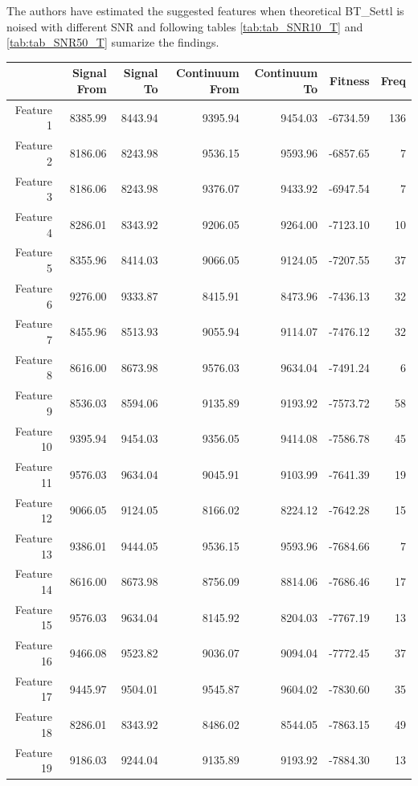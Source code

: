 {{The authors have estimated the suggested features when theoretical BT\_Settl 
is noised with different SNR and following tables \ref{tab:tab_SNR10_T} 
and \ref{tab:tab_SNR50_T} sumarize the findings.


\begin{table}
\begin{center}
\begin{tabular}{rrrrrrr}
  \hline
 & Signal From & Signal To & Continuum From & Continuum To & Fitness & Freq \\ 
  \hline
Feature 1 & 8385.99 & 8443.94 & 9395.94 & 9454.03 & -6734.59 & 136 \\ 
  Feature 2 & 8186.06 & 8243.98 & 9536.15 & 9593.96 & -6857.65 &   7 \\ 
  Feature 3 & 8186.06 & 8243.98 & 9376.07 & 9433.92 & -6947.54 &   7 \\ 
  Feature 4 & 8286.01 & 8343.92 & 9206.05 & 9264.00 & -7123.10 &  10 \\ 
  Feature 5 & 8355.96 & 8414.03 & 9066.05 & 9124.05 & -7207.55 &  37 \\ 
  Feature 6 & 9276.00 & 9333.87 & 8415.91 & 8473.96 & -7436.13 &  32 \\ 
  Feature 7 & 8455.96 & 8513.93 & 9055.94 & 9114.07 & -7476.12 &  32 \\ 
  Feature 8 & 8616.00 & 8673.98 & 9576.03 & 9634.04 & -7491.24 &   6 \\ 
  Feature 9 & 8536.03 & 8594.06 & 9135.89 & 9193.92 & -7573.72 &  58 \\ 
  Feature 10 & 9395.94 & 9454.03 & 9356.05 & 9414.08 & -7586.78 &  45 \\ 
  Feature 11 & 9576.03 & 9634.04 & 9045.91 & 9103.99 & -7641.39 &  19 \\ 
  Feature 12 & 9066.05 & 9124.05 & 8166.02 & 8224.12 & -7642.28 &  15 \\ 
  Feature 13 & 9386.01 & 9444.05 & 9536.15 & 9593.96 & -7684.66 &   7 \\ 
  Feature 14 & 8616.00 & 8673.98 & 8756.09 & 8814.06 & -7686.46 &  17 \\ 
  Feature 15 & 9576.03 & 9634.04 & 8145.92 & 8204.03 & -7767.19 &  13 \\ 
  Feature 16 & 9466.08 & 9523.82 & 9036.07 & 9094.04 & -7772.45 &  37 \\ 
  Feature 17 & 9445.97 & 9504.01 & 9545.87 & 9604.02 & -7830.60 &  35 \\ 
  Feature 18 & 8286.01 & 8343.92 & 8486.02 & 8544.05 & -7863.15 &  49 \\ 
  Feature 19 & 9186.03 & 9244.04 & 9135.89 & 9193.92 & -7884.30 &  13 \\ 

\end{tabular}
\end{center}
\end{table}}}
